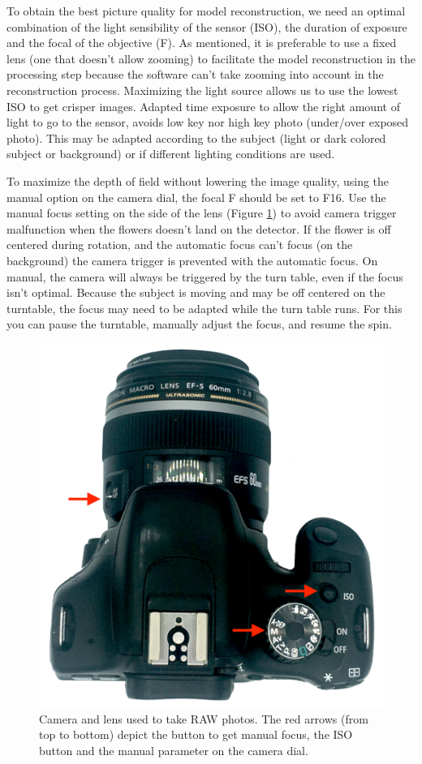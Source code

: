 \documentclass[
]{book}
\begin{document}
To obtain the best picture quality for model reconstruction, we need an optimal combination of the light sensibility of the sensor (ISO), the duration of exposure and the focal of the objective (F). As mentioned, it is preferable to use a fixed lens (one that doesn't allow zooming) to facilitate the model reconstruction in the processing step because the software can't take zooming into account in the reconstruction process. Maximizing the light source allows us to use the lowest ISO to get crisper images. Adapted time exposure to allow the right amount of light to go to the sensor, avoids low key nor high key photo (under/over exposed photo). This may be adapted according to the subject (light or dark colored subject or background) or if different lighting conditions are used.

To maximize the depth of field without lowering the image quality, using the manual option on the camera dial, the focal F should be set to F16. Use the manual focus setting on the side of the lens (Figure \ref{fig:camera-arrows}) to avoid camera trigger malfunction when the flowers doesn't land on the detector. If the flower is off centered during rotation, and the automatic focus can't focus (on the background) the camera trigger is prevented with the automatic focus. On manual, the camera will always be triggered by the turn table, even if the focus isn't optimal. Because the subject is moving and may be off centered on the turntable, the focus may need to be adapted while the turn table runs. For this you can pause the turntable, manually adjust the focus, and resume the spin.

\begin{figure}

{\centering \includegraphics[width=0.33\linewidth]{Figures/camera_arrows} 

}

\caption{Camera and lens used to take RAW photos. The red arrows (from top to bottom) depict the button to get manual focus, the ISO button and the manual parameter on the camera dial.}\label{fig:camera-arrows}
\end{figure}
\end{document}
